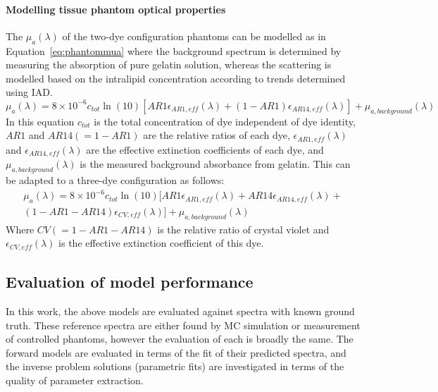\paragraph{Modelling tissue phantom optical properties}\label{sec:methodphantommodel}
The $\mu_a(\lambda)$ of the two-dye configuration phantoms can be modelled as in Equation~\eqref{eq:phantommua} where the background spectrum is determined by measuring the absorption of pure gelatin solution, whereas the scattering is modelled based on the intralipid concentration according to trends determined using IAD. 
\begin{equation}
    \mu_{a}(\lambda) = 8\times10^{-6}c_{tot}\ln(10)[AR1 \epsilon_{AR1, eff}(\lambda) + 
    (1 - AR1)
    \epsilon_{AR14, eff}(\lambda)] + \mu_{a, background}(\lambda)
    \label{eq:phantommua} %
\end{equation}
In this equation $c_{tot}$ is the total concentration of dye independent of dye identity, $AR1$ and 
$AR14 (=1-AR1)$
are the relative ratios of each dye, $\epsilon_{AR1, eff}(\lambda)$ and $\epsilon_{AR14, eff}(\lambda)$ are the effective extinction coefficients of each dye, and  $\mu_{a, background}(\lambda)$ is the measured background absorbance from gelatin. This can be adapted to a three-dye configuration as follows: 
\begin{multline}
    \mu_{a}(\lambda) = 8\times10^{-6}c_{tot}\ln(10)[AR1 \epsilon_{AR1, eff}(\lambda) + AR14\epsilon_{AR14, eff}(\lambda) +\\
    (1 - AR1 - AR14)\epsilon_{CV, eff}(\lambda)] + \mu_{a, background}(\lambda)
    \label{eq:phantommua3}
\end{multline}
Where 
$CV (=1-AR1-AR14) $
is the relative ratio of crystal violet and $\epsilon_{CV, eff}(\lambda)$ is the effective extinction coefficient of this dye.

\subsection{Evaluation of model performance}\label{sec:methodevaluate}
In this work, the above models are evaluated against spectra with known ground truth. These reference spectra are either found by MC simulation or measurement of controlled phantoms, however the evaluation of each is broadly the same. The forward models are evaluated in terms of the fit of their predicted spectra, and the inverse problem solutions (parametric fits) are investigated in terms of the quality of parameter extraction. 

